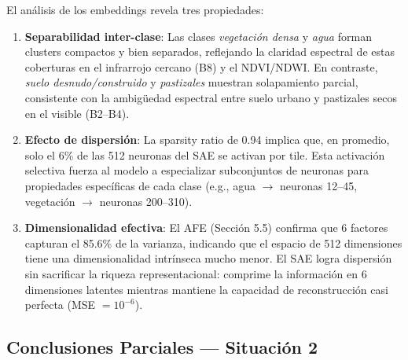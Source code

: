 \documentclass[10pt,a4paper,twocolumn]{article}
\begin{document}
El análisis de los embeddings revela tres propiedades:

\begin{enumerate}[nosep, leftmargin=*, itemsep=2pt]
  \item \textbf{Separabilidad inter-clase}: Las clases \textit{vegetación densa} y \textit{agua} forman clusters compactos y bien separados, reflejando la claridad espectral de estas coberturas en el infrarrojo cercano (B8) y el NDVI/NDWI. En contraste, \textit{suelo desnudo/construido} y \textit{pastizales} muestran solapamiento parcial, consistente con la ambigüedad espectral entre suelo urbano y pastizales secos en el visible (B2--B4).
  \item \textbf{Efecto de dispersión}: La sparsity ratio de 0.94 implica que, en promedio, solo el 6\% de las 512 neuronas del SAE se activan por tile. Esta activación selectiva fuerza al modelo a especializar subconjuntos de neuronas para propiedades específicas de cada clase (e.g., agua $\to$ neuronas 12--45, vegetación $\to$ neuronas 200--310).
  \item \textbf{Dimensionalidad efectiva}: El AFE (Sección 5.5) confirma que 6 factores capturan el 85.6\% de la varianza, indicando que el espacio de 512 dimensiones tiene una dimensionalidad intrínseca mucho menor. El SAE logra dispersión sin sacrificar la riqueza representacional: comprime la información en 6 dimensiones latentes mientras mantiene la capacidad de reconstrucción casi perfecta (MSE $= 10^{-6}$).
\end{enumerate}

\subsection{Conclusiones Parciales --- Situación 2}
\end{document}
